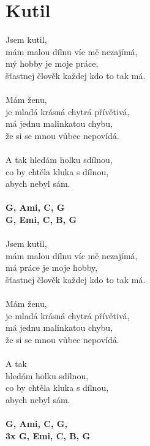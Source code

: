 \section{Kutil}
Jsem kutil,\\
mám malou dílnu víc mě nezajímá,\\
mý hobby je moje práce,\\
šťastnej člověk každej kdo to tak má.\\
\\
Mám ženu,\\
je mladá krásná chytrá přívětivá,\\
má jednu malinkatou chybu,\\
že si se mnou vůbec nepovídá.\\
\\
A tak hledám holku sdílnou,\\
co by chtěla kluka s dílnou,\\
abych nebyl sám.\\
\\
\footnotesize\textbf{G, Ami, C, G\\
G, Emi, C, B\be, G}\\
\\
\normalsize
Jsem kutil,\\
mám malou dílnu víc mě nezajímá,\\
má práce je moje hobby,\\
šťastnej člověk každej kdo to tak má.\\
\\
Mám ženu,\\
je mladá krásná chytrá přívětivá,\\
má jednu malinkatou chybu,\\
že si se mnou vůbec nepovídá.\\
\\
A tak\\
hledám holku sdílnou,\\
co by chtěla kluka s dílnou,\\
abych nebyl sám.\\
\\
\footnotesize\textbf{G, Ami, C, G,}\\
\textbf{3x G, Emi, C, B\be, G}\\
\normalsize